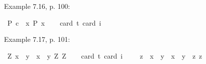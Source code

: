 \begin{isabellebody}
%
\begin{isamarkuptext}%
Example 7.16, p. 100:%
\end{isamarkuptext}\isamarkuptrue%
\isamarkupfalse%
\ {\isachardoublequoteopen}{\isasymlfloor}\isactrlbold {\isasymbox}{\isacharparenleft}P\ \isactrlbold {\isasymdownharpoonleft}{\isacharparenleft}c{\isacharcolon}{\isacharcolon}{\isasymup}{\isasymzero}{\isacharparenright}{\isacharparenright}\ \isactrlbold {\isasymrightarrow}\ {\isacharparenleft}\isactrlbold {\isasymexists}x{\isacharcolon}{\isacharcolon}{\isasymzero}{\isachardot}\ \isactrlbold {\isasymbox}{\isacharparenleft}P\ x{\isacharparenright}{\isacharparenright}{\isasymrfloor}{\isachardoublequoteclose}\ \isanewline
\ \ \isamarkupfalse%
{\isacharbrackleft}card\ {\isacharprime}t{\isacharequal}{}{\isacharcomma}\ card\ i{\isacharequal}{}{\isacharbrackright}%
\isadelimproof
\ %
\endisadelimproof
%
\isatagproof
{}\isamarkupfalse%
\ %
%
\endisatagproof
{\isafoldproof}%
%
\isadelimproof
%
\endisadelimproof
%
\begin{isamarkuptext}%
Example 7.17, p. 101:%
\end{isamarkuptext}\isamarkuptrue%
\isamarkupfalse%
\ {\isachardoublequoteopen}{\isasymlfloor}\isactrlbold {\isasymforall}Z{\isacharcolon}{\isacharcolon}{\isasymup}{\isasymzero}{\isachardot}\ {\isacharparenleft}{\isasymlambda}x{\isacharcolon}{\isacharcolon}{\isasymzero}{\isachardot}\ \ \isactrlbold {\isasymbox}{\isacharparenleft}{\isacharparenleft}{\isasymlambda}y{\isacharcolon}{\isacharcolon}{\isasymzero}{\isachardot}\ \ x\ \isactrlbold {\isasymapprox}\ y{\isacharparenright}\ \isactrlbold {\isasymdownharpoonleft}Z{\isacharparenright}{\isacharparenright}\ \isactrlbold {\isasymdownharpoonleft}Z{\isasymrfloor}{\isachardoublequoteclose}\ \isanewline
\ \ \isamarkupfalse%
{\isacharbrackleft}card\ {\isacharprime}t{\isacharequal}{}{\isacharcomma}\ card\ i{\isacharequal}{}{\isacharbrackright}%
\isadelimproof
\ %
\endisadelimproof
%
\isatagproof
{}\isamarkupfalse%
\ %
%
\endisatagproof
{\isafoldproof}%
%
\isadelimproof
%
\endisadelimproof
\isanewline
{}\isamarkupfalse%
\ {\isachardoublequoteopen}{\isasymlfloor}\isactrlbold {\isasymforall}z{\isacharcolon}{\isacharcolon}{\isasymzero}{\isachardot}\ \ {\isacharparenleft}{\isasymlambda}x{\isacharcolon}{\isacharcolon}{\isasymzero}{\isachardot}\ \ \isactrlbold {\isasymbox}{\isacharparenleft}{\isacharparenleft}{\isasymlambda}y{\isacharcolon}{\isacharcolon}{\isasymzero}{\isachardot}\ \ x\ \isactrlbold {\isasymapprox}\ y{\isacharparenright}\ \ z{\isacharparenright}{\isacharparenright}\ z{\isasymrfloor}{\isachardoublequoteclose}%

\end{isabellebody}
